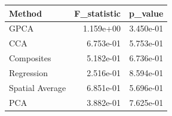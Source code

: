 \begin{tabular}{lrr}
\toprule
Method & F_statistic & p_value \\
\midrule
GPCA & 1.159e+00 & 3.450e-01 \\
CCA & 6.753e-01 & 5.753e-01 \\
Composites & 5.182e-01 & 6.736e-01 \\
Regression & 2.516e-01 & 8.594e-01 \\
Spatial Average & 6.851e-01 & 5.696e-01 \\
PCA & 3.882e-01 & 7.625e-01 \\
\bottomrule
\end{tabular}
